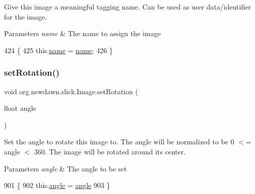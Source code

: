 Give this image a meaningful tagging name. Can be used as user data/identifier for the image.


\begin{DoxyParams}{Parameters}
{\em name} & The name to assign the image \\
\hline
\end{DoxyParams}

\begin{DoxyCode}
424                                      \{
425         this.\mbox{\hyperlink{classorg_1_1newdawn_1_1slick_1_1_image_a6965c875dc3a3106ccbcc7a6b308c240}{name}} = \mbox{\hyperlink{classorg_1_1newdawn_1_1slick_1_1_image_a6965c875dc3a3106ccbcc7a6b308c240}{name}};
426     \}
\end{DoxyCode}
\mbox{\label{classorg_1_1newdawn_1_1slick_1_1_image_a6c4607d7ab6869b78ef6b81762b6698e}} 
\subsubsection{\texorpdfstring{set\+Rotation()}{setRotation()}}
{\footnotesize\ttfamily void org.\+newdawn.\+slick.\+Image.\+set\+Rotation (\begin{DoxyParamCaption}\item[{float}]{angle }\end{DoxyParamCaption})\hspace{0.3cm}{\ttfamily [inline]}}

Set the angle to rotate this image to. The angle will be normalized to be 0 $<$= angle $<$ 360. The image will be rotated around its center.


\begin{DoxyParams}{Parameters}
{\em angle} & The angle to be set \\
\hline
\end{DoxyParams}

\begin{DoxyCode}
901                                          \{ 
902         this.\mbox{\hyperlink{classorg_1_1newdawn_1_1slick_1_1_image_a4076b08a44e95eba2b65075342f16070}{angle}} = \mbox{\hyperlink{classorg_1_1newdawn_1_1slick_1_1_image_a4076b08a44e95eba2b65075342f16070}{angle}} %
903     \} 
\end{DoxyCode}
\mbox{\label{classorg_1_1newdawn_1_1slick_1_1_image_a73b8afaa9bb100680f5bec87f4a75cdb}} 
